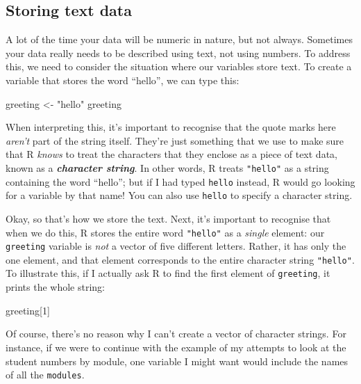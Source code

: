 \documentclass[
]{book}
\newenvironment{Shaded}{\begin{snugshade}}{\end{snugshade}}
\newcommand{\DecValTok}[1]{\textcolor[rgb]{0.00,0.00,0.81}{#1}}
\newcommand{\NormalTok}[1]{#1}
\newcommand{\OtherTok}[1]{\textcolor[rgb]{0.56,0.35,0.01}{#1}}
\newcommand{\StringTok}[1]{\textcolor[rgb]{0.31,0.60,0.02}{#1}}
\begin{document}
\hypertarget{text}{%
\subsection{Storing text data}\label{text}}

A lot of the time your data will be numeric in nature, but not always. Sometimes your data really needs to be described using text, not using numbers. To address this, we need to consider the situation where our variables store text. To create a variable that stores the word ``hello'', we can type this:

\begin{Shaded}
\begin{Highlighting}[]
\NormalTok{greeting }\OtherTok{\textless{}{-}} \StringTok{"hello"}
\NormalTok{greeting}
\end{Highlighting}
\end{Shaded}

When interpreting this, it's important to recognise that the quote marks here \emph{aren't} part of the string itself. They're just something that we use to make sure that R \emph{knows} to treat the characters that they enclose as a piece of text data, known as a \textbf{\emph{character string}}. In other words, R treats \texttt{"hello"} as a string containing the word ``hello''; but if I had typed \texttt{hello} instead, R would go looking for a variable by that name! You can also use \texttt{\textquotesingle{}hello\textquotesingle{}} to specify a character string.

Okay, so that's how we store the text. Next, it's important to recognise that when we do this, R stores the entire word \texttt{"hello"} as a \emph{single} element: our \texttt{greeting} variable is \emph{not} a vector of five different letters. Rather, it has only the one element, and that element corresponds to the entire character string \texttt{"hello"}. To illustrate this, if I actually ask R to find the first element of \texttt{greeting}, it prints the whole string:

\begin{Shaded}
\begin{Highlighting}[]
\NormalTok{greeting[}\DecValTok{1}\NormalTok{]}
\end{Highlighting}
\end{Shaded}

Of course, there's no reason why I can't create a vector of character strings. For instance, if we were to continue with the example of my attempts to look at the student numbers by module, one variable I might want would include the names of all the \texttt{modules}.
\end{document}
